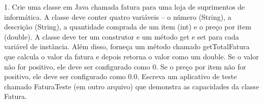  1. Crie uma classe em Java chamada fatura para uma loja de
suprimentos de informática. A classe deve conter quatro variáveis – o número (String), a
descrição (String), a quantidade comprada de um item (int) e o preço por item
(double). A classe deve ter um construtor e um método get e set para cada variável de
instância. Além disso, forneça um método chamado getTotalFatura que calcula o valor
da fatura e depois retorna o valor como um double. Se o valor não for positivo, ele deve ser
configurado como 0. Se o preço por item não for positivo, ele deve ser configurado como 0.0.
Escreva um aplicativo de teste chamado FaturaTeste (em outro arquivo) que demonstra
as capacidades da classe Fatura. 